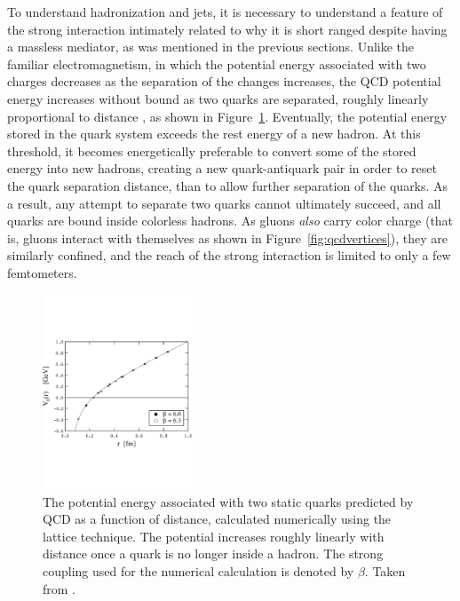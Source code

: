   To understand hadronization and jets, it is necessary to understand a feature of the strong interaction intimately related to why it is short ranged despite having a massless mediator, as was mentioned in the previous sections.
  Unlike the familiar electromagnetism, in which the potential energy associated with two charges decreases as the separation of the changes increases, the QCD potential energy increases without bound as two quarks are separated, roughly linearly proportional to distance \cite{lattice_potential}, as shown in Figure~\ref{fig:QCDpotential}.
  Eventually, the potential energy stored in the quark system exceeds the rest energy of a new hadron.
  At this threshold, it becomes energetically preferable to convert some of the stored energy into new hadrons, creating a new quark-antiquark pair in order to reset the quark separation distance, than to allow further separation of the quarks.
  As a result, any attempt to separate two quarks cannot ultimately succeed, and all quarks are bound inside colorless hadrons. 
  As gluons {\it also} carry color charge (that is, gluons interact with themselves as shown in Figure~\ref{fig:qcdvertices}), they are similarly confined, and the reach of the strong interaction is limited to only a few femtometers.

  \begin{figure}[h!]
    \centering
    \includegraphics[width=0.4\textwidth]{figures/lattice_potential_qcd.pdf}
    \caption[Tracker material budget.]{
      The potential energy associated with two static quarks predicted by QCD as a function of distance, calculated numerically using the lattice technique.
      The potential increases roughly linearly with distance once a quark is no longer inside a hadron.
      The strong coupling used for the numerical calculation is denoted by $\beta$.
      Taken from \cite{lattice_potential}.}
    \label{fig:QCDpotential}
  \end{figure}  

